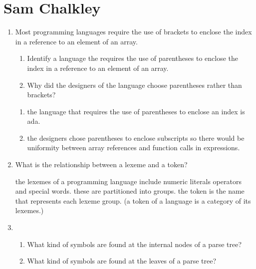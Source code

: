 
\chapter{Sam Chalkley}

\begin{enumerate}
  \item Most programming languages require the use of brackets to
    enclose the index in a reference to an element of an array.
  \begin{enumerate}
    \item Identify a language the requires the use of parentheses
      to enclose the index in a reference to an element of an array.
    \item Why did the designers of the language choose parentheses
      rather than brackets?
    \end{enumerate}

  \begin{answer}

  \begin{enumerate}
    \item the language that requires the use of parentheses to enclose
      an index is ada.
    \item the designers chose parentheses to enclose subscripts so
      there would be uniformity between array references and function
      calls in expressions.
    \end{enumerate}

    \end{answer}
    
  \item What is the relationship between a lexeme and a token?

  \begin{answer}

    the lexemes of a programming language include numeric literals
    operators and special words. these are partitioned into
    groups. the token is the name that represents each lexeme
    group. (a token of a language is a category of its lexemes.)

    \end{answer}

  \item
  \begin{enumerate}
    \item What kind of symbols are found at the internal nodes of a
      parse tree?
    \item What kind of symbols are found at the leaves of a parse tree?
    \end{enumerate}


\end{enumerate}
